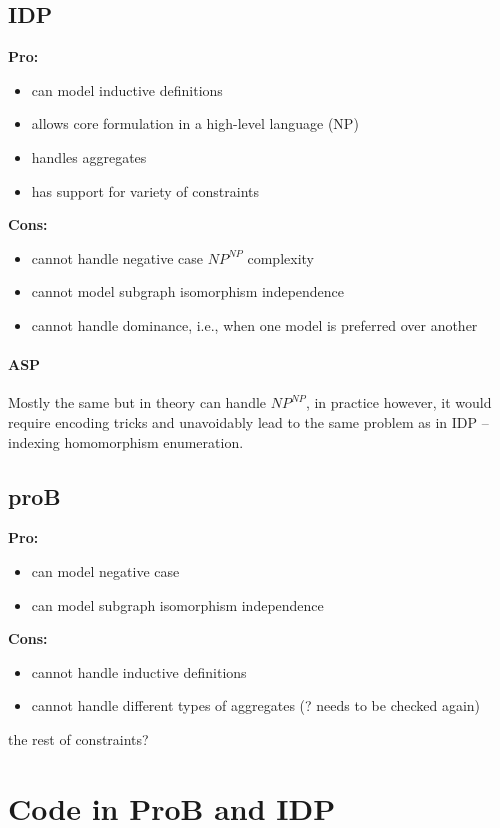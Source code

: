 \documentclass{article}
\theoremstyle{definition}
\begin{document}
\subsection{IDP} 

\textbf{Pro:}
\begin{itemize}
  \item can model inductive definitions
  \item allows core formulation in a high-level language (NP)
  \item handles aggregates
  \item has support for variety of constraints
\end{itemize}
\textbf{Cons:}
\begin{itemize}
  \item cannot handle negative case $\textit{NP}^\textit{NP}$ complexity
  \item cannot model subgraph isomorphism independence
  \item cannot handle dominance, i.e., when one model is preferred over another 
\end{itemize}

\paragraph{ASP}
Mostly the same but in theory can handle $\textit{NP}^\textit{NP}$, in practice however, it would require encoding tricks and unavoidably lead to the same problem as in IDP -- indexing homomorphism enumeration.

\subsection{proB}
\textbf{Pro:}
\begin{itemize}
  \item can model negative case
  \item can model subgraph isomorphism independence
\end{itemize}
\textbf{Cons:}
\begin{itemize}
  \item cannot handle inductive definitions
  \item cannot handle different types of aggregates (? needs to be checked again)
\end{itemize}

the rest of constraints? 

\section{Code in ProB and IDP}

\pagebreak

\end{document}
